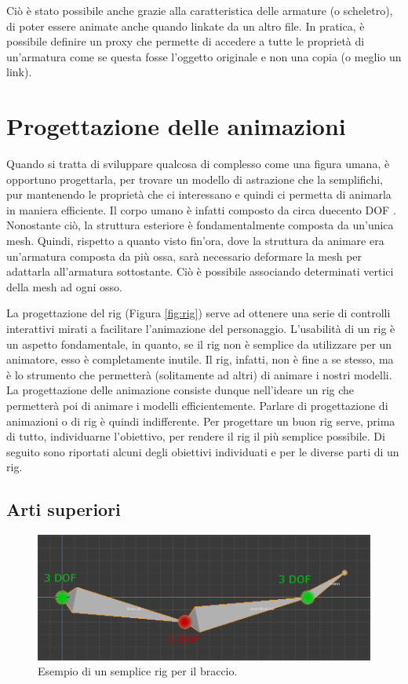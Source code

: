 Ciò è stato possibile anche grazie alla caratteristica delle armature (o scheletro), di poter essere animate anche quando linkate da un altro file.
In pratica, è possibile definire un proxy che permette di accedere a tutte le proprietà di un'armatura come se questa fosse l'oggetto originale e non una copia (o meglio un link).

\section{Progettazione delle animazioni}

Quando si tratta di sviluppare qualcosa di complesso come una figura umana, è opportuno progettarla, per trovare un modello di astrazione che la semplifichi, pur mantenendo le proprietà che ci interessano e quindi ci permetta di animarla in maniera efficiente.
Il corpo umano è infatti composto da circa duecento DOF \cite{Parent:2012:CAA:2385444}.
Nonostante ciò, la struttura esteriore è fondamentalmente composta da un'unica mesh.
Quindi, rispetto a quanto visto fin'ora, dove la struttura da animare era un'armatura composta da più ossa, sarà necessario deformare la mesh per adattarla all'armatura sottostante. Ciò è possibile associando determinati vertici della mesh ad ogni osso.

La progettazione del rig (Figura \ref{fig:rig}) serve ad ottenere una serie di controlli interattivi mirati a facilitare l'animazione del personaggio.
L'usabilità di un rig è un aspetto fondamentale, in quanto, se il rig non è semplice da utilizzare per un animatore, esso è completamente inutile.
Il rig, infatti, non è fine a se stesso, ma è lo strumento che permetterà (solitamente ad altri) di animare i nostri modelli.
La progettazione delle animazione consiste dunque nell'ideare un rig che permetterà poi di animare i modelli efficientemente. Parlare di progettazione di animazioni o di rig è quindi indifferente.
Per progettare un buon rig serve, prima di tutto, individuarne l'obiettivo, per rendere il rig il più semplice possibile.
Di seguito sono riportati alcuni degli obiettivi individuati e per le diverse parti di un rig.

\newpage
\subsection{Arti superiori}

\begin{figure}
\centering
\includegraphics[width=.8\textwidth]{Figures/arm}
\decoRule
\caption[Rig braccio]{Esempio di un semplice rig per il braccio.}
\label{fig:arm}
\end{figure}

